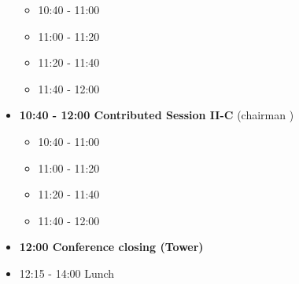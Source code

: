 \documentclass[10pt, A4]{article}%
\begin{document}
\begin{itemize}
\begin{itemize}
    \item 10:40 - 11:00 
    \item 11:00 - 11:20 
    \item 11:20 - 11:40 
    \item 11:40 - 12:00  
  \end{itemize}
  \item {\bf 10:40 - 12:00 Contributed Session II-C} (chairman ) 
  \begin{itemize}
    \item 10:40 - 11:00 
    \item 11:00 - 11:20 
    \item 11:20 - 11:40 
    \item 11:40 - 12:00 
  \end{itemize}
  \item {\bf 12:00 Conference closing (Tower)}
  \item 12:15 - 14:00 Lunch
\newpage
\end{itemize}
\end{document}
